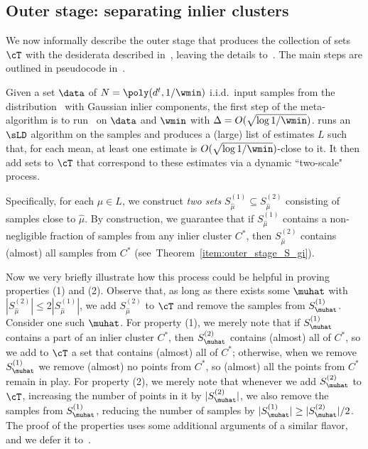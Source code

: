 \subsection{Outer stage: separating inlier clusters}
\label{sec:outer_stage}
We now informally describe the outer stage that produces the collection of sets $\cT$ with the desiderata described in~, leaving the details to~. The main steps are outlined in pseudocode in~.

Given a set \(\data\) of  \(N=\poly(d^t, 1/\wmin)\) i.i.d.~input samples from the distribution~ with Gaussian inlier components, the first step of the meta-algorithm is to run~ on \(\data\) and \(\wmin\)  
with \(\Delta = O(\sqrt{\log 1 / \wmin})\).
 runs an $\sLD$ algorithm on the samples and produces a (large) list of estimates $L$ such that, for each mean, at least one estimate is $O(\sqrt{\log 1/\wmin})$-close to it.
It then add sets to $\cT$ that correspond to these estimates via a dynamic ``two-scale" process.



Specifically, for each $\hat\mu \in L$, we construct \emph{two sets} $S_{\hat\mu}^{(1)} \subseteq S_{\hat\mu}^{(2)}$ consisting of samples close to $\hat\mu$.
By construction, we guarantee that if $S_{\hat\mu}^{(1)}$ contains a non-negligible fraction of samples from any inlier cluster $C^*$, then $S_{\hat\mu}^{(2)}$ contains (almost) all samples from $C^*$ (see~Theorem~\ref{item:outer_stage_S_gi}).

Now we very briefly illustrate how this process could be helpful in proving properties (1) and (2).
Observe that, as long as there exists some $\muhat$ with $|S_{\hat\mu}^{(2)}| \leq 2|S_{\hat\mu}^{(1)}|$, we add $S_{\hat\mu}^{(2)}$ to $\cT$ and remove the samples from $S_{\muhat}^{(1)}$.
Consider one such $\muhat$.
For property (1), we merely note that if $S_{\muhat}^{(1)}$ contains a part of an inlier cluster $C^*$, then $S_{\muhat}^{(2)}$ contains (almost) all of $C^*$, so we add to $\cT$ a set that contains (almost) all of $C^*$; otherwise, when we remove $S_{\muhat}^{(1)}$ we remove (almost) no points from $C^*$, so (almost) all the points from $C^*$ remain in play.
For property (2), we merely note that whenever we add $S_{\muhat}^{(2)}$ to $\cT$, increasing the number of points in it by $|S_{\muhat}^{(2)}|$, we also remove the samples from $S_{\muhat}^{(1)}$, reducing the number of samples by $|S_{\muhat}^{(1)}| \geq |S_{\muhat}^{(2)}|/2$.
The proof of the properties uses some additional arguments of a similar flavor, and we defer it to~.